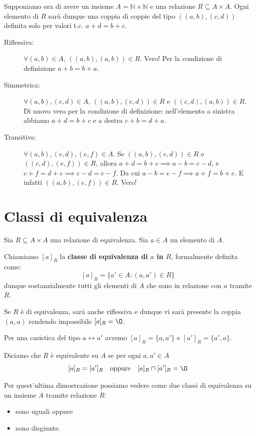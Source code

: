\documentclass[12pt]{report}
\newcommand{\N}{\mathbb{N}}
\begin{document}
	Supponiamo ora di avere un insieme $A = \N \times \N$ e una relazione $R \subseteq A \times A$.
	Ogni elemento di $R$ sarà dunque una coppia di coppie del tipo $((a, b), (c, d))$ definita solo per valori t.c. $a + d = b + c$.
	
	\begin{description}
		\item [Riflessiva:] $\forall (a, b) \in A, \, ((a, b), (a, b)) \in R$. Vero! Per la condizione di definizione $a + b = b + a$.
		\item [Simmetrica:] $\forall (a, b), (c, d) \in A$, $((a, b), (c, d)) \in R$ e $((c, d), (a, b)) \in R$.
		Di nuovo vero per la condizione di definizione: nell'elemento a sinistra abbiamo $a + d = b + c$ e a destra $c + b = d + a$.
		\item [Transitiva:] $\forall (a, b), (c, d), (e, f) \in A$.
		Se $((a, b), (c, d)) \in R$ e $((c, d), (e, f)) \in R$, allora $a + d = b + c \implies a - b = c - d$, e $c + f = d + e \implies c - d = e - f$.
		Da cui $a - b = e - f \implies a + f = b + e$.
		E infatti $((a, b), (e, f)) \in R$. Vero!
	\end{description}
	
	\section{Classi di equivalenza}
	Sia $R \subseteq A \times A$ una relazione di equivalenza. Sia $a \in A$ un elemento di $A$.
	
	Chiamiamo $[a]_R$ la \textbf{classe di equivalenza di $a$ in $R$}, formalmente definita come:
	\[
	[a]_R = \{a' \in A : (a, a') \in R\}
	\]
	dunque sostanzialmente tutti gli elementi di $A$ che sono in relazione con $a$ tramite $R$.
	
	\begin{osservazione}{}{}
		Se $R$ è di equivalenza, sarà anche riflessiva e dunque vi sarà presente la coppia $(a, a)$ rendendo impossibile $[a]_R = \O$.
	\end{osservazione}
	
	Per una casistica del tipo $a \longleftrightarrow a'$ avremo $[a]_R = \{a, a'\}$ e $[a']_R = \{a', a\}$.
	
	Diciamo che $R$ è equivalente su $A$ se per ogni $a, a' \in A$
	\[
	[a]_R = [a']_R \quad \text{oppure} \quad [a]_R \cap [a']_R = \O
	\]
	
	Per quest'ultima dimostrazione possiamo vedere come due classi di equivalenza su un insieme $A$ tramite relazione $R$:
	\begin{itemize}
		\item sono uguali oppure
		\item sono disgiunte.
	\end{itemize}
	
\end{document}
